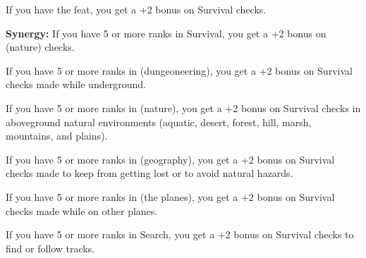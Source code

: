 If you have the  feat, you get a +2 bonus on Survival checks.

\textbf{Synergy:} If you have 5 or more ranks in Survival, you get a +2 bonus on  (nature) checks.

If you have 5 or more ranks in  (dungeoneering), you get a +2 bonus on Survival checks made while underground.

If you have 5 or more ranks in  (nature), you get a +2 bonus on Survival checks in aboveground natural environments (aquatic, desert, forest, hill, marsh, mountains, and plains).

If you have 5 or more ranks in  (geography), you get a +2 bonus on Survival checks made to keep from getting lost or to avoid natural hazards.

If you have 5 or more ranks in  (the planes), you get a +2 bonus on Survival checks made while on other planes.

If you have 5 or more ranks in Search, you get a +2 bonus on Survival checks to find or follow tracks.

